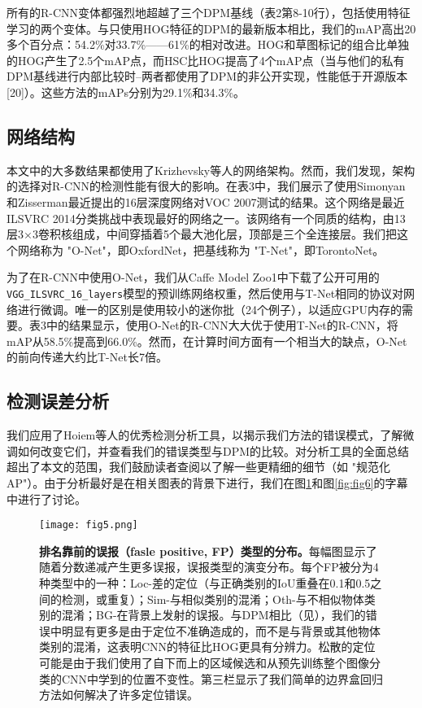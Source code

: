 \documentclass[../main.tex]{subfile}
\begin{document}
所有的R-CNN变体都强烈地超越了三个DPM基线（表2第8-10行），包括使用特征学习的两个变体。与只使用HOG特征的DPM的最新版本相比，我们的mAP高出20多个百分点：54.2\%对33.7\%——61\%的相对改进。HOG和草图标记的组合比单独的HOG产生了2.5个mAP点，而HSC比HOG提高了4个mAP点（当与他们的私有DPM基线进行内部比较时--两者都使用了DPM的非公开实现，性能低于开源版本[20]）。这些方法的mAPs分别为29.1\%和34.3\%。

\subsection{网络结构}

本文中的大多数结果都使用了Krizhevsky等人\cite{alexnet}的网络架构。然而，我们发现，架构的选择对R-CNN的检测性能有很大的影响。在表3中，我们展示了使用Simonyan和Zisserman\cite{vgg}最近提出的16层深度网络对VOC 2007测试的结果。这个网络是最近ILSVRC 2014分类挑战中表现最好的网络之一。该网络有一个同质的结构，由13层3×3卷积核组成，中间穿插着5个最大池化层，顶部是三个全连接层。我们把这个网络称为 "O-Net"，即OxfordNet，把基线称为 "T-Net"，即TorontoNet。

为了在R-CNN中使用O-Net，我们从Caffe Model Zoo1中下载了公开可用的\lstinline{VGG_ILSVRC_16_layers}模型的预训练网络权重，然后使用与T-Net相同的协议对网络进行微调。唯一的区别是使用较小的迷你批（24个例子），以适应GPU内存的需要。表3中的结果显示，使用O-Net的R-CNN大大优于使用T-Net的R-CNN，将mAP从58.5\%提高到66.0\%。然而，在计算时间方面有一个相当大的缺点，O-Net的前向传递大约比T-Net长7倍。

\subsection{检测误差分析}

我们应用了Hoiem等人\cite{diagnosing}的优秀检测分析工具，以揭示我们方法的错误模式，了解微调如何改变它们，并查看我们的错误类型与DPM的比较。对分析工具的全面总结超出了本文的范围，我们鼓励读者查阅\cite{diagnosing}以了解一些更精细的细节（如 "规范化AP"）。由于分析最好是在相关图表的背景下进行，我们在图\ref{fig:fig5}和图\ref{fig:fig6}的字幕中进行了讨论。

\begin{figure}[H]
    \centering
    \texttt{[image: fig5.png]}
    \caption{\textbf{排名靠前的误报（fasle positive, FP）类型的分布。}每幅图显示了随着分数递减产生更多误报，误报类型的演变分布。每个FP被分为4种类型中的一种：Loc-差的定位（与正确类别的IoU重叠在0.1和0.5之间的检测，或重复）；Sim-与相似类别的混淆；Oth-与不相似物体类别的混淆；BG-在背景上发射的误报。与DPM相比（见\cite{dpm}），我们的错误中明显有更多是由于定位不准确造成的，而不是与背景或其他物体类别的混淆，这表明CNN的特征比HOG更具有分辨力。松散的定位可能是由于我们使用了自下而上的区域候选和从预先训练整个图像分类的CNN中学到的位置不变性。第三栏显示了我们简单的边界盒回归方法如何解决了许多定位错误。}
    \label{fig:fig5}
\end{figure}
\end{document}
